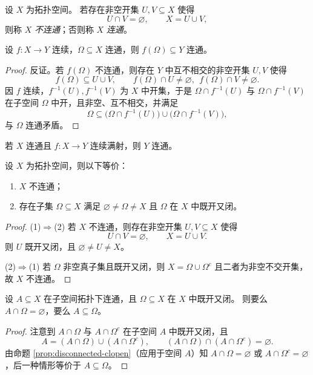 \documentclass[lang=cn,a4paper,newtx,figureplace=section,tableplace=section]{elegantbook}
\begin{document}
\begin{definition}[连通与不连通]\label{def:connected}
  设 $X$ 为拓扑空间。
  若存在非空开集 $U,V\subseteq X$ 使得
  \[
    U\cap V=\varnothing,\qquad X=U\cup V,
  \]
  则称 $X$ \emph{不连通}；否则称 $X$ \emph{连通}。
\end{definition}

\begin{proposition}\label{prop:connected-image}
  设 $f:X\to Y$ 连续，$\Omega\subseteq X$ 连通，则 $f(\Omega)\subseteq Y$ 连通。
\end{proposition}
\begin{proof}
  反证。若 $f(\Omega)$ 不连通，则存在 $Y$ 中互不相交的非空开集 $U,V$ 使得
  \[
    f(\Omega)\subseteq U\cup V,\qquad f(\Omega)\cap U\ne\varnothing,\ \ f(\Omega)\cap V\ne\varnothing.
  \]
  因 $f$ 连续，$f^{-1}(U),f^{-1}(V)$ 为 $X$ 中开集，于是 $\Omega\cap f^{-1}(U)$ 与 $\Omega\cap f^{-1}(V)$ 在子空间 $\Omega$ 中开，且非空、互不相交，并满足
  \[
    \Omega\subseteq\big(\Omega\cap f^{-1}(U)\big)\cup\big(\Omega\cap f^{-1}(V)\big),
  \]
  与 $\Omega$ 连通矛盾。
\end{proof}
\begin{corollary}\label{cor:connected-surjective-image}
  若 $X$ 连通且 $f:X\to Y$ 连续满射，则 $Y$ 连通。
\end{corollary}

\begin{proposition}\label{prop:disconnected-clopen}
  设 $X$ 为拓扑空间，则以下等价：
  \begin{enumerate}
    \item $X$ 不连通；
    \item 存在子集 $\Omega\subseteq X$ 满足 $\varnothing\neq\Omega\neq X$ 且 $\Omega$ 在 $X$ 中既开又闭。
  \end{enumerate}
\end{proposition}
\begin{proof}
  (1)$\Rightarrow$(2) 若 $X$ 不连通，则存在非空开集 $U,V\subseteq X$ 使得
  \[
    U\cap V=\varnothing,\qquad X=U\cup V.
  \]
  则 $U$ 既开又闭，且 $\varnothing\neq U\neq X$。

  (2)$\Rightarrow$(1) 若 $\Omega$ 非空真子集且既开又闭，则 $X=\Omega\cup\Omega^{c}$ 且二者为非空不交开集，故 $X$ 不连通。
\end{proof}

\begin{lemma}\label{lem:connected-meets-clopen}
  设 $A\subseteq X$ 在子空间拓扑下连通，且 $\Omega\subseteq X$ 在 $X$ 中既开又闭。
  则要么 $A\cap\Omega=\varnothing$，要么 $A\subseteq\Omega$。
\end{lemma}
\begin{proof}
  注意到 $A\cap\Omega$ 与 $A\cap\Omega^{c}$ 在子空间 $A$ 中既开又闭，且
  \[
    A=(A\cap\Omega)\cup(A\cap\Omega^{c}),\qquad (A\cap\Omega)\cap(A\cap\Omega^{c})=\varnothing.
  \]
  由命题 \ref{prop:disconnected-clopen}（应用于空间 $A$）知 $A\cap\Omega=\varnothing$ 或 $A\cap\Omega^{c}=\varnothing$，后一种情形等价于 $A\subseteq\Omega$。
\end{proof}
\end{document}
